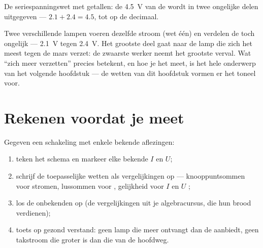 \begin{omfigure}

{\small De seriespanningswet met getallen: de \qty{4.5}{V} van de
 wordt in twee ongelijke delen uitgegeven --- $2.1 + 2.4 =
4.5$, tot op de decimaal.}
\end{omfigure}

\begin{example}\label{ex:g8:circuit-laws:unequal}
Twee verschillende lampen  voeren dezelfde stroom (wet
één) en verdelen de  toch ongelijk --- \qty{2.1}{V}
tegen \qty{2.4}{V}. Het grootste deel gaat naar de lamp die zich het
meest tegen de mars verzet: de zwaarste werker neemt het grootste
verval. Wat ``zich meer verzetten'' precies betekent, en hoe je het
meet, is het hele onderwerp van het volgende hoofdstuk --- de
wetten van dit hoofdstuk vormen er het toneel voor.
\end{example}

\section{Rekenen voordat je meet}

\begin{method}\label{met:g8:circuit-laws:solve}
Gegeven een schakeling met enkele bekende aflezingen:
\begin{enumerate}
  \item teken het schema en markeer elke bekende $I$ en $U$;
  \item schrijf de toepasselijke wetten als vergelijkingen op ---
        knooppuntsommen voor stromen, lussommen voor
        , gelijkheid voor $I$  en $U$
        ;
  \item los de onbekenden op (de vergelijkingen uit je algebracursus,
        die hun brood verdienen);
  \item toets op gezond verstand: geen lamp die meer ontvangt dan de
         aanbiedt, geen takstroom die groter is dan die
        van de hoofdweg.
\end{enumerate}
\end{method}

